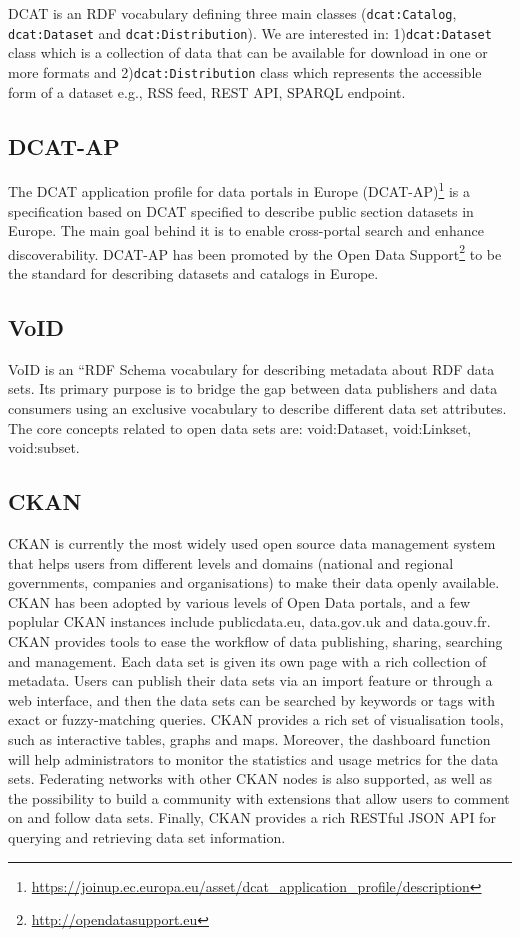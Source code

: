 \documentclass[runningheads,a4paper]{llncs}
\begin{document}
DCAT is an RDF vocabulary defining three main classes (\texttt{dcat:Catalog}, \texttt{dcat:Dataset} and \texttt{dcat:Distribution}). We are interested in: 1)\texttt{dcat:Dataset} class which is a collection of data that can be available for download in one or more formats and 2)\texttt{dcat:Distribution} class which represents the accessible form of a dataset e.g., RSS feed, REST API, SPARQL endpoint.

\subsection{DCAT-AP}

The DCAT application profile for data portals in Europe (DCAT-AP)\footnote{\url{https://joinup.ec.europa.eu/asset/dcat\_application\_profile/description}} is a specification based on DCAT specified to describe public section datasets in Europe. The main goal behind it is to enable cross-portal search and enhance discoverability. DCAT-AP has been promoted by the Open Data Support\footnote{\url{http://opendatasupport.eu}} to be the standard for describing datasets and catalogs in Europe.

\subsection{VoID}

VoID is an “RDF Schema vocabulary for describing metadata about RDF data sets. Its primary purpose is to bridge the gap between data publishers and data consumers using an exclusive vocabulary to describe different data set attributes. The core concepts related to open data sets are: void:Dataset, void:Linkset, void:subset.

\subsection{CKAN}

CKAN is currently the most widely used open source data management system that helps users from different levels and domains (national and regional governments, companies and organisations) to make their data openly available. CKAN has been adopted by various levels of Open Data portals, and a few poplular CKAN instances include publicdata.eu, data.gov.uk and data.gouv.fr. CKAN provides tools to ease the workflow of data publishing, sharing, searching and management. Each data set is given its own page with a rich collection of metadata. Users can publish their data sets via an import feature or through a web interface, and then the data sets can be searched by keywords or tags with exact or fuzzy-matching queries. CKAN provides a rich set of visualisation tools, such as interactive tables, graphs and maps. Moreover, the dashboard function will help administrators to monitor the statistics and usage metrics for the data sets. Federating networks with other CKAN nodes is also supported, as well as the possibility to build a community with extensions that allow users to comment on and follow data sets. Finally, CKAN provides a rich RESTful JSON API for querying and retrieving data set information.
\end{document}
